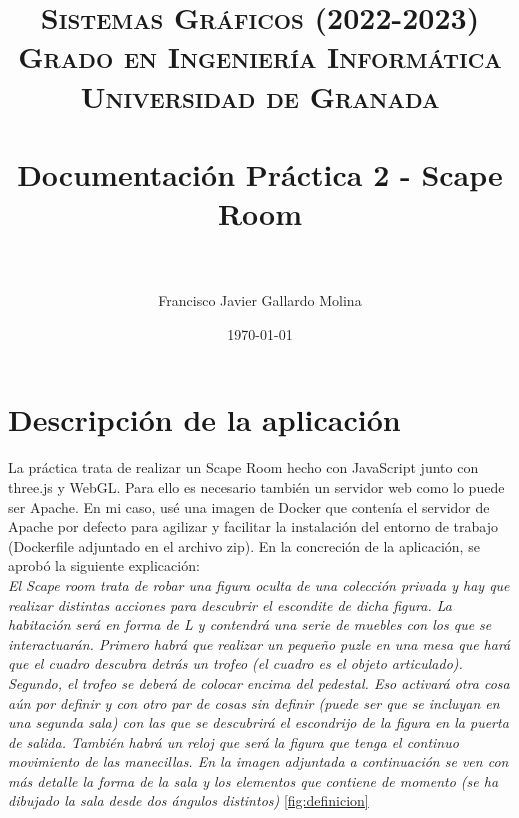 
\usepackage{blindtext}
\usepackage{hyperref}
\usepackage{listings}
\usepackage{graphicx}
\graphicspath{ {images/} }

\title{	
\normalfont \normalsize 
\textsc{\textbf{Sistemas Gráficos (2022-2023)} \\ Grado en Ingeniería Informática \\ Universidad de Granada} \\ [25pt] %
\horrule{0.5pt} \\[0.4cm] %
\huge Documentación Práctica 2 - Scape Room \\ %
\horrule{2pt} \\[0.5cm] %
}

\author{Francisco Javier Gallardo Molina} %

\date{\normalsize\today} %

\renewcommand{\footrulewidth}{0.4pt}
\rfoot[]{\thepage}



\maketitle

\newpage

\horrule{1pt}
\tableofcontents

\newpage

\section{Descripción de la aplicación}

La práctica trata de realizar un Scape Room hecho con JavaScript junto con three.js y WebGL. Para ello es necesario también un servidor web como lo puede ser Apache. En mi caso, usé una imagen de Docker que contenía el servidor de Apache por defecto para agilizar y facilitar la instalación del entorno de trabajo (Dockerfile adjuntado en el archivo zip). En la concreción de la aplicación, se aprobó la siguiente explicación:\\

\textit{El Scape room trata de robar una figura oculta de una colección privada y hay que realizar distintas acciones para descubrir el escondite de dicha figura. La habitación será en forma de L y contendrá una serie de muebles con los que se interactuarán. Primero habrá que realizar un pequeño puzle en una mesa que hará que el cuadro descubra detrás un trofeo (el cuadro es el objeto articulado). Segundo, el trofeo se deberá de colocar encima del pedestal. Eso activará otra cosa aún por definir y con otro par de cosas sin definir (puede ser que se incluyan en una segunda sala) con las que se descubrirá el escondrijo de la figura en la puerta de salida. También habrá un reloj que será la figura que tenga el continuo movimiento de las manecillas. En la imagen adjuntada a continuación se ven con más detalle la forma de la sala y los elementos que contiene de momento (se ha dibujado la sala desde dos ángulos distintos)} \ref{fig:definicion}

